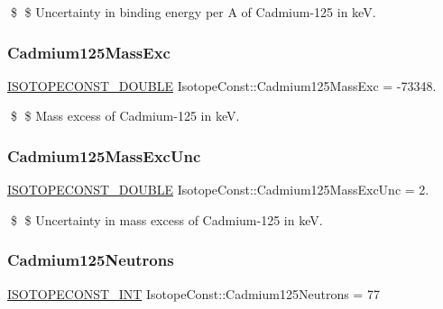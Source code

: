\$ \$ Uncertainty in binding energy per A of Cadmium-\/125 in keV. \mbox{\label{group___isotope_const-_cadmium-_cd125_ga9295fc96d1013e608b90a0f5e95d507b}} 
\subsubsection{\texorpdfstring{Cadmium125\+Mass\+Exc}{Cadmium125MassExc}}
{\footnotesize\ttfamily \mbox{\hyperlink{group___isotope_const-_macros_ga8f45a7272ce02c0b4c65c44636ed719a}{I\+S\+O\+T\+O\+P\+E\+C\+O\+N\+S\+T\+\_\+\+D\+O\+U\+B\+LE}} Isotope\+Const\+::\+Cadmium125\+Mass\+Exc = -\/73348.}

\$ \$ Mass excess of Cadmium-\/125 in keV. \mbox{\label{group___isotope_const-_cadmium-_cd125_gac4ba0221038044f85f10a0d3f3f95cea}} 
\subsubsection{\texorpdfstring{Cadmium125\+Mass\+Exc\+Unc}{Cadmium125MassExcUnc}}
{\footnotesize\ttfamily \mbox{\hyperlink{group___isotope_const-_macros_ga8f45a7272ce02c0b4c65c44636ed719a}{I\+S\+O\+T\+O\+P\+E\+C\+O\+N\+S\+T\+\_\+\+D\+O\+U\+B\+LE}} Isotope\+Const\+::\+Cadmium125\+Mass\+Exc\+Unc = 2.}

\$ \$ Uncertainty in mass excess of Cadmium-\/125 in keV. \mbox{\label{group___isotope_const-_cadmium-_cd125_ga38312bb52a63772fd1cb6ab71267742f}} 
\subsubsection{\texorpdfstring{Cadmium125\+Neutrons}{Cadmium125Neutrons}}
{\footnotesize\ttfamily \mbox{\hyperlink{group___isotope_const-_macros_ga5f18360b3e99483a35c32d789e62621c}{I\+S\+O\+T\+O\+P\+E\+C\+O\+N\+S\+T\+\_\+\+I\+NT}} Isotope\+Const\+::\+Cadmium125\+Neutrons = 77}

